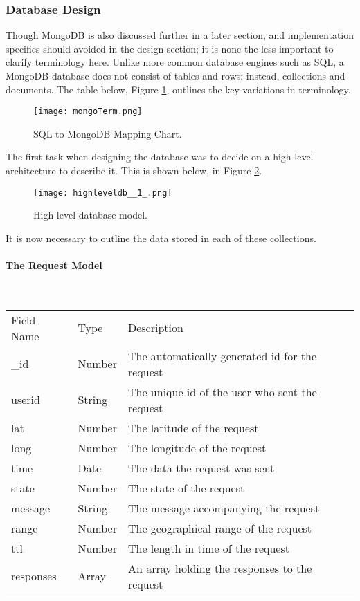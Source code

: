 \documentclass[a4paper]{article}
\newcommand{\subsubsubsection}[1]{\paragraph{#1}\mbox{}\\}
\begin{document}
\subsubsection{Database Design}
Though MongoDB is also discussed further in a later section, and implementation specifics should avoided in the design section; it is none the less important to clarify terminology here. Unlike more common database engines such as SQL, a MongoDB database does not consist of tables and rows; instead, collections and documents. The table below, Figure \ref{fig:sqlMongo},  outlines the key variations in terminology.


\begin{figure}[H]
  \centering
    \texttt{[image: mongoTerm.png]} %
     \caption{SQL to MongoDB Mapping Chart.}
      \label{fig:sqlMongo}
\end{figure}

The first task when designing the database was to decide on a high level architecture to describe it. This is shown below, in Figure \ref{fig:hldatabase}.

\begin{figure}[H]
  \centering
    \texttt{[image: highleveldb\_\_1\_.png]} 
     \caption{High level database model.}
     \label{fig:hldatabase}
\end{figure}

It is now necessary to outline the data stored in each of these collections. 

\subsubsubsection{The Request Model}
\begin{table}[H]
\centering
       \begin{tabular}{lll}
    Field Name & Type   & Description                                    \\
    \_id       & Number & The automatically generated id for the request \\
    userid     & String & The unique id of the user who sent the request \\
    lat        & Number & The latitude of the request                    \\
    long       & Number & The longitude of the request                   \\
    time       & Date   & The data the request was sent                  \\
    state      & Number & The state of the request                       \\
    message    & String & The message accompanying the request           \\
    range      & Number & The geographical range of the request          \\
    ttl        & Number & The length in time of the request              \\
    responses  & Array  & An array holding the responses to the request  \\                                      
    \end{tabular}
\end{table}
\end{document}
